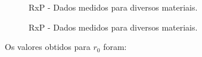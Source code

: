 \documentclass[brazilian,12pt,a4paper,final]{article}
\begin{document}
\begin{figure}[htbp!]
  \caption{RxP - Dados medidos para diversos materiais.}
  \label{rxptodos}
  \centering
\end{figure}

\begin{figure}[htbp!]
  \caption{RxP - Dados medidos para diversos materiais.}
  \label{rxpsel}
  \centering
\end{figure}

Os valores obtidos para $r_0$ foram:
\end{document}
